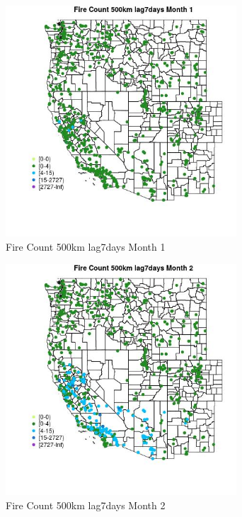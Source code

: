 \begin{figure} 
\centering  
\includegraphics[width=0.77\textwidth]{Code_Outputs/Report_ML_input_PM25_Step4_part_f_de_duplicated_aves_prioritize_24hr_obswNAs_MapObsMo1Fire_Count_500km_lag7days.jpg} 
\caption{\label{fig:Report_ML_input_PM25_Step4_part_f_de_duplicated_aves_prioritize_24hr_obswNAsMapObsMo1Fire_Count_500km_lag7days}Fire Count 500km lag7days Month 1} 
\end{figure} 
 

\begin{figure} 
\centering  
\includegraphics[width=0.77\textwidth]{Code_Outputs/Report_ML_input_PM25_Step4_part_f_de_duplicated_aves_prioritize_24hr_obswNAs_MapObsMo2Fire_Count_500km_lag7days.jpg} 
\caption{\label{fig:Report_ML_input_PM25_Step4_part_f_de_duplicated_aves_prioritize_24hr_obswNAsMapObsMo2Fire_Count_500km_lag7days}Fire Count 500km lag7days Month 2} 
\end{figure} 
 

